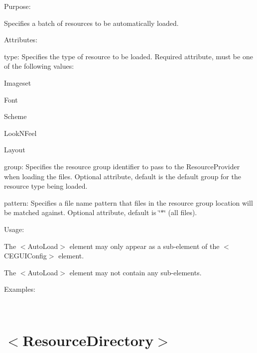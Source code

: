 \begin{DoxyItemize}
\item Purpose\+:
\begin{DoxyItemize}
\item Specifies a batch of resources to be automatically loaded.
\end{DoxyItemize}
\item Attributes\+:
\begin{DoxyItemize}
\item {\ttfamily type\+:} Specifies the type of resource to be loaded. Required attribute, must be one of the following values\+:
\begin{DoxyItemize}
\item {\ttfamily Imageset} 
\item {\ttfamily Font} 
\item {\ttfamily Scheme} 
\item {\ttfamily Look\+N\+Feel} 
\item {\ttfamily Layout} 
\end{DoxyItemize}
\item {\ttfamily group\+:} Specifies the resource group identifier to pass to the Resource\+Provider when loading the files. Optional attribute, default is the default group for the resource type being loaded.
\item {\ttfamily pattern\+:} Specifies a file name pattern that files in the resource group location will be matched against. Optional attribute, default is \char`\"{}$\ast$\char`\"{} (all files).
\end{DoxyItemize}
\item Usage\+:
\begin{DoxyItemize}
\item The $<$Auto\+Load$>$ element may only appear as a sub-\/element of the $<$C\+E\+G\+U\+I\+Config$>$ element.
\item The $<$Auto\+Load$>$ element may not contain any sub-\/elements.
\end{DoxyItemize}
\item Examples\+:
\end{DoxyItemize}

~\newline
 \hypertarget{xml_config_xml_config_resourcedirectory}{}\section{$<$\+Resource\+Directory$>$}\label{xml_config_xml_config_resourcedirectory}

